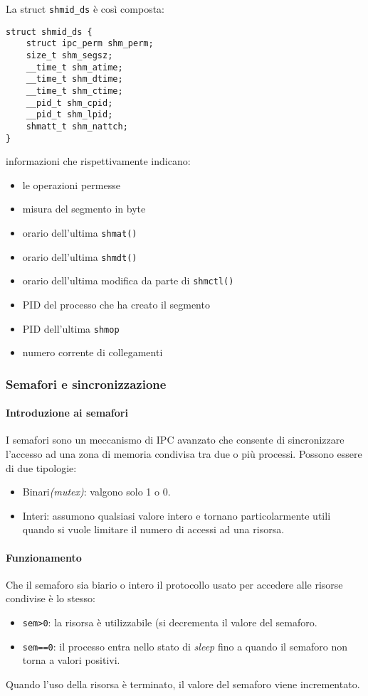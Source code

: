 \documentclass[a4paper]{article}
\begin{document}
La struct \verb|shmid_ds| è così composta:
\begin{verbatim}
struct shmid_ds {
    struct ipc_perm shm_perm;
    size_t shm_segsz;
    __time_t shm_atime;
    __time_t shm_dtime;
    __time_t shm_ctime;
    __pid_t shm_cpid;
    __pid_t shm_lpid;
    shmatt_t shm_nattch;
}
\end{verbatim}
informazioni che rispettivamente indicano:
\begin{itemize}
\item le operazioni permesse
\item misura del segmento in byte
\item orario dell'ultima \verb|shmat()|
\item orario dell'ultima \verb|shmdt()|
\item orario dell'ultima modifica da parte di \verb|shmctl()|
\item PID del processo che ha creato il segmento
\item PID dell'ultima \verb|shmop|
\item numero corrente di collegamenti
\end{itemize}

\subsubsection{Semafori e sincronizzazione}
\paragraph{Introduzione ai semafori}
I semafori sono un meccanismo di IPC avanzato che consente di sincronizzare l'accesso ad una zona di memoria condivisa tra due o più processi.
Possono essere di due tipologie:
\begin{itemize}
\item Binari\textit{(mutex)}: valgono solo 1 o 0.
\item Interi: assumono qualsiasi valore intero e tornano particolarmente utili quando si vuole limitare il numero di accessi ad una risorsa.
\end{itemize}

\paragraph{Funzionamento}
Che il semaforo sia biario o intero il protocollo usato per accedere alle risorse condivise è lo stesso:
\begin{itemize}
\item \verb|sem>0|: la risorsa è utilizzabile (si decrementa il valore del semaforo.
\item \verb|sem==0|: il processo entra nello stato di \textit{sleep} fino a quando il semaforo non torna a valori positivi.
\end{itemize}
Quando l'uso della risorsa è terminato, il valore del semaforo viene incrementato.
\end{document}
